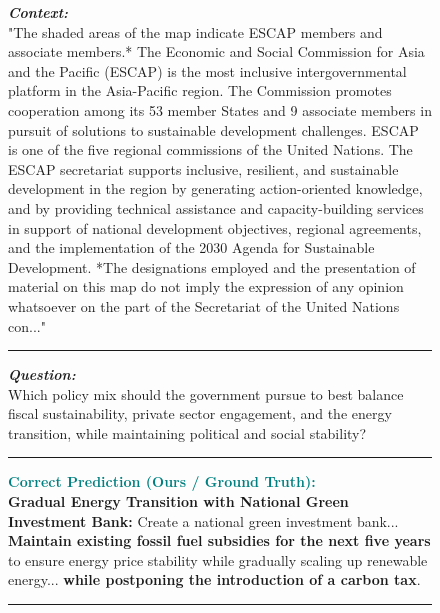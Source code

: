 \begin{figure}[ht]
\begin{AcademicBox}
\small 
\setlength{\parindent}{0pt}

\textbf{\textit{Context:}} \\
"The shaded areas of the map indicate ESCAP members and associate members.* 
The Economic and Social Commission for Asia and the Pacific (ESCAP) is the most inclusive intergovernmental platform in 
the Asia-Pacific region. The Commission promotes cooperation among its 53 member States and 9 associate members in 
pursuit of solutions to sustainable development challenges. ESCAP is one of the five regional commissions of the United 
Nations. 
The ESCAP secretariat supports inclusive, resilient, and sustainable development in the region by generating action-oriented 
knowledge, and by providing technical assistance and capacity-building services in support of national development 
objectives, regional agreements, and the implementation of the 2030 Agenda for Sustainable Development. 
*The designations employed and the presentation of material on this map do not imply the expression of any opinion 
whatsoever on the part of the Secretariat of the United Nations con..."
\vspace{4pt} \hrule \vspace{4pt}

\textbf{\textit{Question:}} \\
Which policy mix should the government pursue to best balance fiscal sustainability, private sector engagement, and the energy transition, while maintaining political and social stability? \\
\vspace{4pt} \hrule \vspace{4pt}

\textbf{\textcolor{teal}{Correct Prediction (Ours / Ground Truth):}} \hfill \textcolor{teal}{\checkmark} \\
\textbf{Gradual Energy Transition with National Green Investment Bank:} 
Create a national green investment bank... \textbf{Maintain existing fossil fuel subsidies for the next five years} to ensure energy price stability while gradually scaling up renewable energy... \textbf{while postponing the introduction of a carbon tax}.
\vspace{4pt} \hrule \vspace{4pt}


\end{AcademicBox}
\end{figure}
